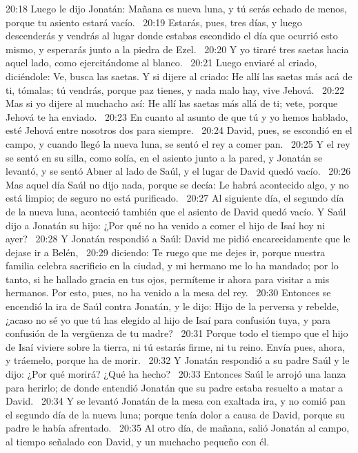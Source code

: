 20:18 Luego le dijo Jonatán: Mañana es nueva luna, y tú serás echado de menos, porque tu asiento estará vacío.  
20:19 Estarás, pues, tres días, y luego descenderás y vendrás al lugar donde estabas escondido el día que ocurrió esto mismo, y esperarás junto a la piedra de Ezel.  
20:20 Y yo tiraré tres saetas hacia aquel lado, como ejercitándome al blanco.  
20:21 Luego enviaré al criado, diciéndole: Ve, busca las saetas. Y si dijere al criado: He allí las saetas más acá de ti, tómalas; tú vendrás, porque paz tienes, y nada malo hay, vive Jehová.  
20:22 Mas si yo dijere al muchacho así: He allí las saetas más allá de ti; vete, porque Jehová te ha enviado.  
20:23 En cuanto al asunto de que tú y yo hemos hablado, esté Jehová entre nosotros dos para siempre.  
20:24 David, pues, se escondió en el campo, y cuando llegó la nueva luna, se sentó el rey a comer pan.  
20:25 Y el rey se sentó en su silla, como solía, en el asiento junto a la pared, y Jonatán se levantó, y se sentó Abner al lado de Saúl, y el lugar de David quedó vacío.  
20:26 Mas aquel día Saúl no dijo nada, porque se decía: Le habrá acontecido algo, y no está limpio; de seguro no está purificado.  
20:27 Al siguiente día, el segundo día de la nueva luna, aconteció también que el asiento de David quedó vacío. Y Saúl dijo a Jonatán su hijo: ¿Por qué no ha venido a comer el hijo de Isaí hoy ni ayer?  
20:28 Y Jonatán respondió a Saúl: David me pidió encarecidamente que le dejase ir a Belén,  
20:29 diciendo: Te ruego que me dejes ir, porque nuestra familia celebra sacrificio en la ciudad, y mi hermano me lo ha mandado; por lo tanto, si he hallado gracia en tus ojos, permíteme ir ahora para visitar a mis hermanos. Por esto, pues, no ha venido a la mesa del rey.  
20:30 Entonces se encendió la ira de Saúl contra Jonatán, y le dijo: Hijo de la perversa y rebelde, ¿acaso no sé yo que tú has elegido al hijo de Isaí para confusión tuya, y para confusión de la vergüenza de tu madre?  
20:31 Porque todo el tiempo que el hijo de Isaí viviere sobre la tierra, ni tú estarás firme, ni tu reino. Envía pues, ahora, y tráemelo, porque ha de morir.  
20:32 Y Jonatán respondió a su padre Saúl y le dijo: ¿Por qué morirá? ¿Qué ha hecho?  
20:33 Entonces Saúl le arrojó una lanza para herirlo; de donde entendió Jonatán que su padre estaba resuelto a matar a David.  
20:34 Y se levantó Jonatán de la mesa con exaltada ira, y no comió pan el segundo día de la nueva luna; porque tenía dolor a causa de David, porque su padre le había afrentado.  
20:35 Al otro día, de mañana, salió Jonatán al campo, al tiempo señalado con David, y un muchacho pequeño con él.  
